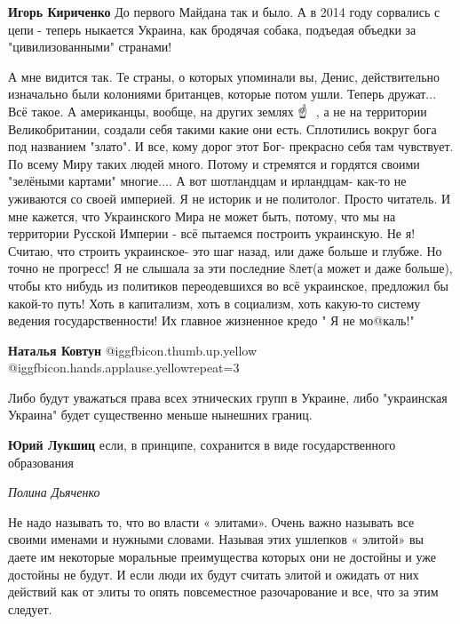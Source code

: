 \begin{itemize}
\begin{itemize}
\textbf{Игорь Кириченко} До первого Майдана так и было. А в 2014 году сорвались с цепи - теперь ныкается Украина, как бродячая собака, подъедая объедки за "цивилизованными" странами!
\end{itemize} %


А мне видится так. Те страны, о которых упоминали вы, Денис, действительно
изначально были колониями британцев, которые потом ушли. Теперь дружат... Всё
такое. А американцы, вообще, на других землях ☝ ️ , а не на территории
Великобритании, создали себя такими какие они есть. Сплотились вокруг бога под
названием "злато". И все, кому дорог этот Бог- прекрасно себя там чувствует. По
всему Миру таких людей много. Потому и стремятся и гордятся своими "зелёными
картами" многие.... А вот шотландцам и ирландцам- как-то не уживаются со своей
империей. Я не историк и не политолог. Просто читатель. И мне кажется, что
Украинского Мира не может быть, потому, что мы на территории Русской Империи -
всё пытаемся построить украинскую. Не я! Считаю, что строить украинское- это
шаг назад, или даже больше и глубже. Но точно не прогресс! Я не слышала за эти
последние 8лет(а может и даже больше), чтобы кто нибудь из политиков
переодевшихся во всё украинское, предложил бы какой-то путь! Хоть в капитализм,
хоть в социализм, хоть какую-то систему ведения государственности! Их главное
жизненное кредо " Я не мо@каль!"

\begin{itemize} %
\textbf{Наталья Ковтун}  @igg{fbicon.thumb.up.yellow}  @igg{fbicon.hands.applause.yellow}{repeat=3} 
\end{itemize} %


Либо будут уважаться права всех этнических групп в Украине, либо "украинская
Украина" будет существенно меньше нынешних границ.

\begin{itemize} %
\textbf{Юрий Лукшиц} если, в принципе, сохранится в виде государственного образования
\end{itemize} %

\emph{Полина Дьяченко}

Не надо называть то, что во власти « элитами». Очень важно называть все своими
именами и нужными словами. Называя этих ушлепков « элитой» вы даете им
некоторые моральные преимущества которых они не достойны и уже достойны не
будут. И если люди их будут считать элитой и ожидать от них действий как от
элиты то опять повсеместное разочарование и все, что за этим следует.


\end{itemize}
